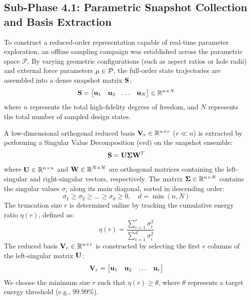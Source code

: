\subsection{Sub-Phase 4.1: Parametric Snapshot Collection and Basis Extraction}
\label{subsec:snapshot_train}

To construct a reduced-order representation capable of real-time parameter exploration, an offline sampling campaign was established across the parametric space $\mathcal{P}$. By varying geometric configurations (such as aspect ratios or hole radii) and external force parameters $\mathbf{\mu} \in \mathcal{P}$, the full-order state trajectories are assembled into a dense snapshot matrix $\mathbf{S}$:
\begin{equation}
    \mathbf{S} = \begin{bmatrix} \mathbf{u}_1 & \mathbf{u}_2 & \dots & \mathbf{u}_N \end{bmatrix} \in \mathbb{R}^{n \times N}
\end{equation}
where $n$ represents the total high-fidelity degrees of freedom, and $N$ represents the total number of sampled design states.

A low-dimensional orthogonal reduced basis $\mathbf{V}_r \in \mathbb{R}^{n \times r}$ ($r \ll n$) is extracted by performing a Singular Value Decomposition (\acrshort{svd}) on the snapshot ensemble:
\begin{equation}
        \mathbf{S} = \mathbf{U} \mathbf{\Sigma} \mathbf{W}^T
\end{equation}
where $\mathbf{U} \in \mathbb{R}^{n \times n}$ and $\mathbf{W} \in \mathbb{R}^{N \times N}$ are orthogonal matrices containing the left-singular and right-singular vectors, respectively. The matrix $\mathbf{\Sigma} \in \mathbb{R}^{n \times N}$ contains the singular values $\sigma_i$ along its main diagonal, sorted in descending order:
\begin{equation}
        \sigma_1 \ge \sigma_2 \ge \dots \ge \sigma_d \ge 0, \quad d = \min(n, N)
\end{equation}
The truncation size $r$ is determined online by tracking the cumulative energy ratio $\eta(r)$, defined as:
\begin{equation}
        \eta(r) = \frac{\sum_{i=1}^r \sigma_i^2}{\sum_{i=1}^d \sigma_i^2}
\end{equation}
The reduced basis $\mathbf{V}_r \in \mathbb{R}^{n \times r}$ is constructed by selecting the first $r$ columns of the left-singular matrix $\mathbf{U}$:
\begin{equation}
        \mathbf{V}_r = \begin{bmatrix} \mathbf{u}_1 & \mathbf{u}_2 & \dots & \mathbf{u}_r \end{bmatrix}
\end{equation}
We choose the minimum size $r$ such that $\eta(r) \ge \theta$, where $\theta$ represents a target energy threshold (e.g., $99.99\%$).

